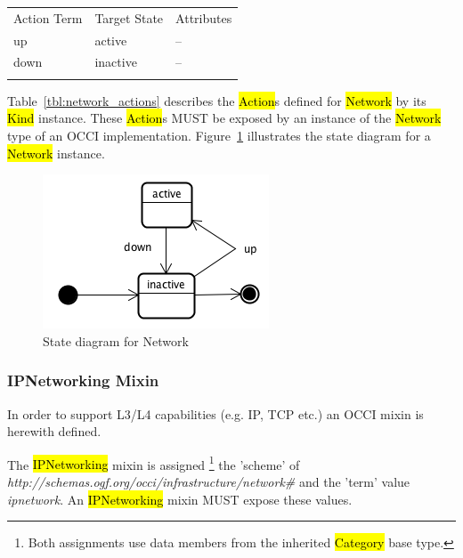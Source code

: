 \documentclass[10pt,a4paper]{article}
\begin{document}
{
	\begin{tabular}{lll}
	\toprule
	Action Term&Target State&Attributes\\
	\colrule
	up & active & --\\
	down & inactive & --\\
	\botrule
	\end{tabular}
}

Table~\ref{tbl:network_actions} describes the \hl{Action}s defined for
\hl{Network} by its \hl{Kind} instance. These \hl{Action}s MUST be exposed 
by an instance of the \hl{Network} type of an OCCI implementation. 
Figure~\ref{fig:network_state} illustrates the state diagram for a \hl{Network} instance.

\begin{figure}[!h]
	\centering
	\includegraphics[scale=0.4]{figs/network-state.png}
	\caption{State diagram for Network}
	\label{fig:network_state}
\end{figure}

\subsubsection{IPNetworking Mixin}

In order to support L3/L4 capabilities (e.g. IP, TCP etc.) an OCCI mixin is herewith defined. 

The \hl{IPNetworking} mixin is assigned 
\footnote{Both assignments use data members from the inherited \hl{Category} 
base type.} the 'scheme' of
\textit{http://schemas.ogf.org/occi/infrastructure/network\#} and the 'term' value 
\textit{ipnetwork}. An \hl{IPNetworking} mixin MUST expose these values.
\end{document}

